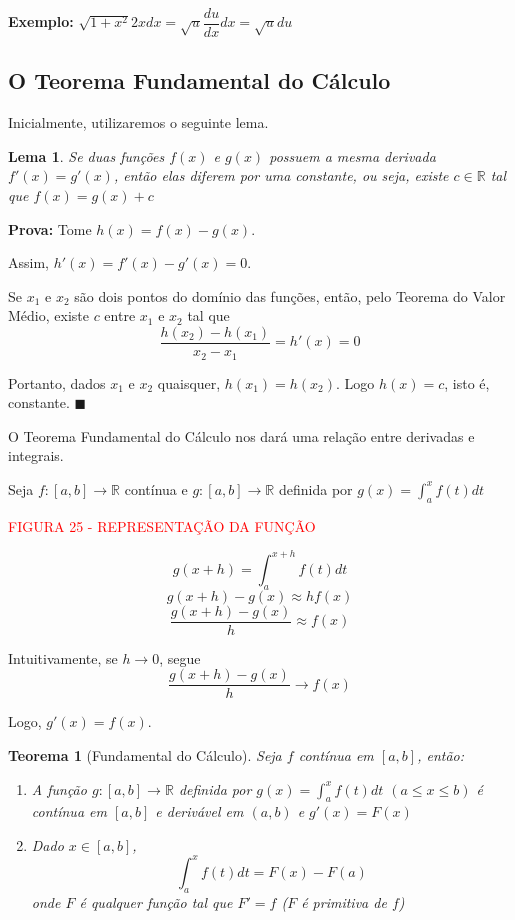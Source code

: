 \documentclass[oneside,a4paper,12pt]{article}
\newtheorem{theorem}{Teorema}[section]
\newtheorem{lemma}{Lema}[section]
\begin{document}
{\bf Exemplo: } $\sqrt{1 + x^2}2xdx = \sqrt{u}\dfrac{du}{dx}dx = \sqrt{u}du$

\subsection{O Teorema Fundamental do Cálculo}

Inicialmente, utilizaremos o seguinte lema.

\begin{lemma}
	Se duas funções $f(x)$ e $g(x)$ possuem a mesma derivada $f'(x) = g'(x)$, então elas diferem por uma constante, ou seja, existe $c \in \mathbb{R}$ tal que $f(x) = g(x) + c$
\end{lemma}

{\bf Prova:} Tome $h(x) = f(x) - g(x)$.

Assim, $h'(x) = f'(x) - g'(x) = 0$.

Se $x_1$ e $x_2$ são dois pontos do domínio das funções, então, pelo Teorema do Valor Médio, existe $c$ entre $x_1$ e $x_2$ tal que 
$$\frac{h(x_2) - h(x_1)}{x_2 - x_1} = h'(x) = 0$$

Portanto, dados $x_1$ e $x_2$ quaisquer, $h(x_1) = h(x_2)$. Logo $h(x) = c$, isto é, constante. $\blacksquare$

O Teorema Fundamental do Cálculo nos dará uma relação entre derivadas e integrais.

Seja $f:[a,b] \rightarrow \mathbb{R}$ contínua e $g:[a,b] \rightarrow \mathbb{R}$ definida por $g(x) = \int_{a}^{x}f(t)dt$


\vspace{220pt}
\begin{center}
	\textcolor{red}{FIGURA 25 - REPRESENTAÇÃO DA FUNÇÃO}
\end{center}

$$g(x+h) = \int_{a}^{x+h}f(t)dt$$
$$g(x+h)-g(x) \approx hf(x)$$
$$\frac{g(x+h) - g(x)}{h} \approx f(x)$$

Intuitivamente, se $h \rightarrow 0$, segue
$$\frac{g(x+h) - g(x)}{h} \rightarrow f(x)$$

Logo, $g'(x) = f(x)$.

\begin{theorem}[Fundamental do Cálculo]
	Seja $f$ contínua em $[a,b]$, então:
	\begin{enumerate}
		\item A função $g:[a,b] \rightarrow \mathbb{R}$ definida por $g(x) = \int_{a}^{x}f(t)dt$ $(a \leq x \leq b)$ é contínua em $[a,b]$ e derivável em $(a,b)$ e $g'(x) = F(x)$
		\item Dado $x \in [a,b]$,
		$$\int_{a}^{x}f(t)dt = F(x) - F(a)$$ onde $F$ é qualquer função tal que $F' = f$ ($F$ é primitiva de $f$)
	\end{enumerate}
\end{theorem}
\end{document}
